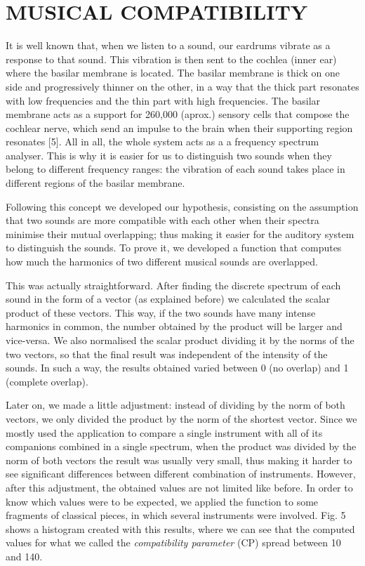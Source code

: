 \documentclass[twocolumn]{revtex4}
\begin{document}
\section{MUSICAL COMPATIBILITY}

It is well known that, when we listen to a sound, our eardrums vibrate as a response to that sound. This vibration is then sent to the cochlea (inner ear) where the basilar membrane is located. The basilar membrane is thick on one side and progressively thinner on the other, in a way that the thick part resonates with low frequencies and the thin part with high frequencies. The basilar membrane acts as a support for 260,000 (aprox.) sensory cells that compose the cochlear nerve, which send an impulse to the brain when their supporting region resonates [5]. All in all, the whole system acts as a a frequency spectrum analyser. This is why it is easier for us to distinguish two sounds when they belong to different frequency ranges: the vibration of each sound takes place in different regions of the basilar membrane. 

Following this concept we developed our hypothesis, consisting on the assumption that two sounds are more compatible with each other when their spectra minimise their mutual overlapping; thus making it easier for the auditory system to distinguish the sounds. To prove it, we developed a function that computes how much the harmonics of two different musical sounds are overlapped. 

This was actually straightforward. After finding the discrete spectrum of each sound in the form of a vector (as explained before) we calculated the scalar product of these vectors. This way, if the two sounds have many intense harmonics in common, the number obtained by the product will be larger and vice-versa. We also normalised the scalar product dividing it by the norms of the two vectors, so that the final result was independent of the intensity of the sounds. In such a way, the results obtained varied between 0 (no overlap) and 1 (complete overlap).

Later on, we made a little adjustment: instead of dividing by the norm of both vectors, we only divided the product by the norm of the shortest vector. Since we mostly used the application to compare a single instrument with all of its companions combined in a single spectrum, when the product was divided by the norm of both vectors the result was usually very small, thus making it harder to see significant differences between different combination of instruments. However, after this adjustment, the obtained values are not limited like before. In order to know which values were to be expected, we applied the function to some fragments of classical pieces, in which several instruments were involved. Fig. 5 shows a histogram created with this results, where we can see that the computed values for what we called the \textsl{compatibility parameter} (CP) spread between 10 and 140.
\end{document}
